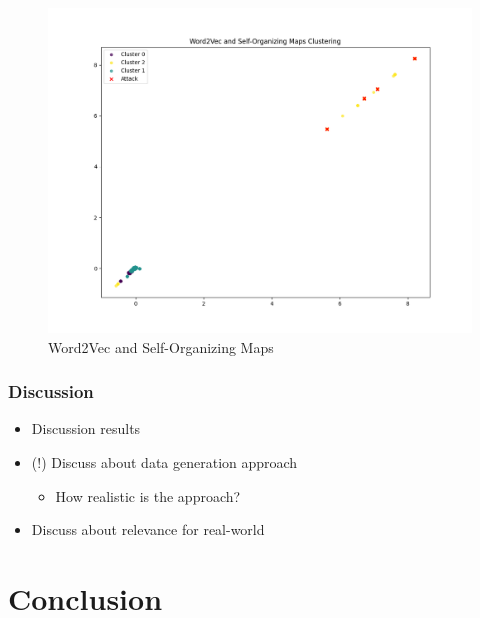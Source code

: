 \documentclass[
    fontsize=12pt,
    headings=small,
    parskip=half,           %
    bibliography=totoc,
    numbers=noenddot,       %
    open=any,               %
    ]{scrreprt}
\begin{document}
\begin{figure}[H]
	\caption{Word2Vec and Self-Organizing Maps}
	\label{fig:som_clusters}
	\sffamily\footnotesize
	\includegraphics[width=1\textwidth]{pic/som_final.png}
	\unitlength=0.75mm
	\linethickness{0.4pt}
\end{figure}


\subsection{Discussion}
\label{subsec:results_discussion}

\begin{itemize}
	\item Discussion results
	\item (!) Discuss about data generation approach
	\begin{itemize}
		\item How realistic is the approach?
	\end{itemize}
	\item Discuss about relevance for real-world
\end{itemize}

\chapter{Conclusion}
\label{chap:conclusion}



\begin{raggedright}         %
  \printbibliography        %
  \label{sec:literaturverzeichnis}
\end{raggedright}
\end{document}
